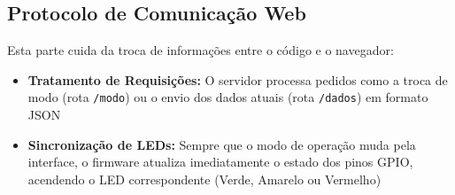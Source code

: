\subsection{Protocolo de Comunicação Web}
\markright{}
Esta parte cuida da troca de informações entre o código e o navegador:
\begin{itemize}
    \item \textbf{Tratamento de Requisições:} O servidor processa pedidos como a troca de modo (rota \texttt{/modo}) ou o envio dos dados atuais (rota \texttt{/dados}) em formato JSON
    \item \textbf{Sincronização de LEDs:} Sempre que o modo de operação muda pela interface, o firmware atualiza imediatamente o estado dos pinos GPIO, acendendo o LED correspondente (Verde, Amarelo ou Vermelho)
\end{itemize}
